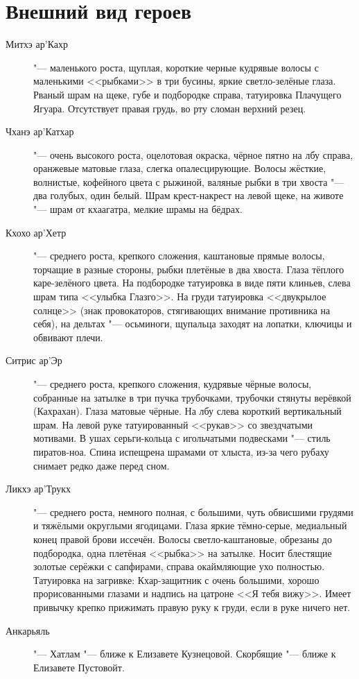 \section{Внешний вид героев}

\begin{description}
\item[Митхэ ар'Кахр] "--- маленького роста, щуплая, короткие черные кудрявые волосы с маленькими <<рыбками>> в три бусины, яркие светло-зелёные глаза.
Рваный шрам на щеке, губе и подбородке справа, татуировка Плачущего Ягуара.
Отсутствует правая грудь, во рту сломан верхний резец.
\item[Чханэ ар'Катхар] "--- очень высокого роста, оцелотовая окраска, чёрное пятно на лбу справа, оранжевые матовые глаза, слегка опалесцирующие.
Волосы жёсткие, волнистые, кофейного цвета с рыжиной, валяные рыбки в три хвоста "--- два голубых, один белый.
Шрам крест-накрест на левой щеке, на животе "--- шрам от кхаагатра, мелкие шрамы на бёдрах.
\item[Кхохо ар'Хетр] "--- среднего роста, крепкого сложения, каштановые прямые волосы, торчащие в разные стороны, рыбки плетёные в два хвоста.
Глаза тёплого каре-зелёного цвета.
На подбородке татуировка в виде пяти клиньев, слева шрам типа <<улыбка Глазго>>.
На груди татуировка <<двукрылое солнце>> (знак провокаторов, стягивающих внимание противника на себя), на дельтах "--- осьминоги, щупальца заходят на лопатки, ключицы и обвивают плечи.
\item[Ситрис ар'Эр] "--- среднего роста, крепкого сложения, кудрявые чёрные волосы, собранные на затылке в три пучка трубочками, трубочки стянуты верёвкой (Кахрахан).
Глаза матовые чёрные.
На лбу слева короткий вертикальный шрам.
На левой руке татуированный <<рукав>> со звездчатыми мотивами.
В ушах серьги-кольца с игольчатыми подвесками "--- стиль пиратов-ноа.
Спина испещрена шрамами от хлыста, из-за чего рубаху снимает редко даже перед сном.
\item[Ликхэ ар'Трукх] "--- среднего роста, немного полная, с большими, чуть обвисшими грудями и тяжёлыми округлыми ягодицами.
Глаза яркие тёмно-серые, медиальный конец правой брови иссечён.
Волосы светло-каштановые, обрезаны до подбородка, одна плетёная <<рыбка>> на затылке.
Носит блестящие золотые серёжки с сапфирами, справа окаймляющие ухо полностью.
Татуировка на загривке: Кхар-защитник с очень большими, хорошо прорисованными глазами и надпись на цатроне <<Я тебя вижу>>.
Имеет привычку крепко прижимать правую руку к груди, если в руке ничего нет.
\item[Анкарьяль] "--- Хатлам "--- ближе к Елизавете Кузнецовой.
Скорбящие "--- ближе к Елизавете Пустовойт.
\end{description}


